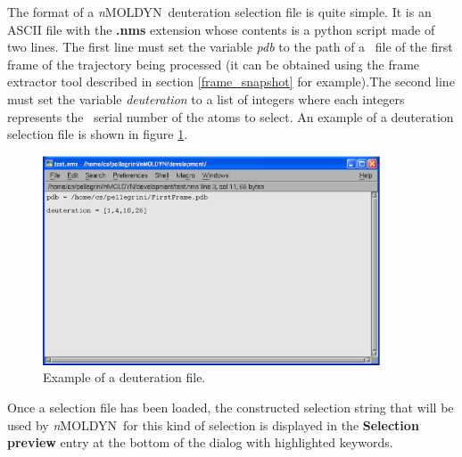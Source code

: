 \documentclass[a4paper,11pt]{report}
\newcommand{\NMOLDYN}{\textit{n}MOLDYN}
\begin{document}
The format of a \NMOLDYN\ deuteration selection file is quite simple. It is an ASCII file with the \textbf{.nms} extension whose 
contents is a python script made of two lines. The first line must set the variable \textit{pdb} to the path of a \PDB\ file 
of the first frame of the trajectory being processed (it can be obtained using the frame extractor tool described in 
section \ref{frame_snapshot} for example).The second line must set the variable \textit{deuteration} to a list of integers 
where each integers represents the \PDB\ serial number of the atoms to select. An example of a deuteration selection file 
is shown in figure \ref{fig:deuteration_selection_file}.
\begin{figure}[h!]
\begin{center}
\includegraphics[width=10cm]{Figures/deuteration_selection_file.eps}
\end{center}
\caption[Example of a deuteration selection file]{Example of a deuteration file.}
\label{fig:deuteration_selection_file}
\end{figure}   

Once a selection file has been loaded, the constructed selection string that will be used by \NMOLDYN\ for this kind of 
selection is displayed in the \textbf{Selection preview} entry at the bottom of the dialog with highlighted keywords.
\newpage
\end{document}

